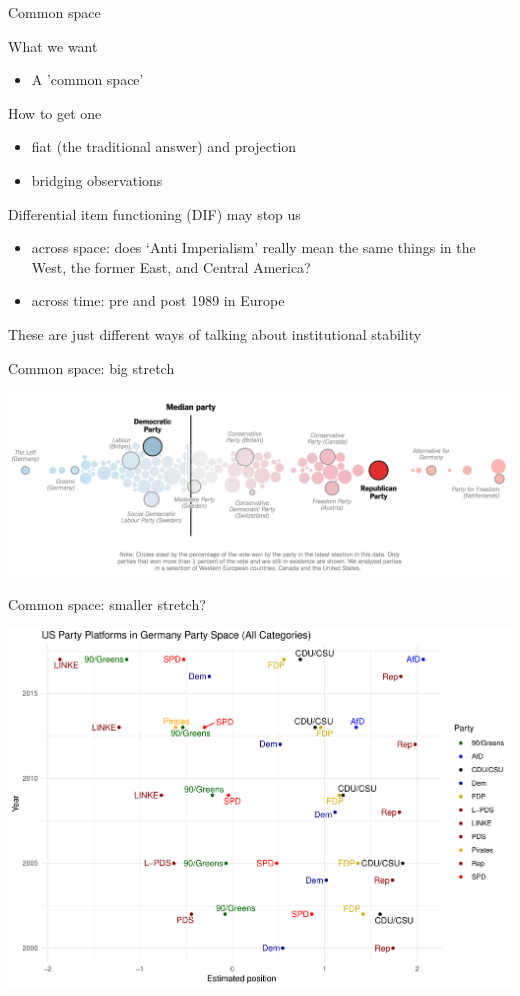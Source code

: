 \documentclass{hertieteaching}
\begin{document}
\begin{frame}{Common space}

What we want
\begin{itemize}
  \item A 'common space' \parencite{Kluver2009}
\end{itemize}
How to get one
\begin{itemize}
  \item fiat (the traditional answer) and projection
  \item bridging observations
\end{itemize}

Differential item functioning (DIF) may stop us
\begin{itemize}
  \item across space: does `Anti Imperialism' really mean the same things in the West, the former East, and Central America?
  \item across time: pre and post 1989 in Europe
\end{itemize}
These are just different ways of talking about 
institutional stability

\end{frame}
\begin{frame}{Common space: big stretch}

\centerline{\includegraphics[scale=0.45]{pictures/nyt-parties}}

\end{frame}
\begin{frame}{Common space: smaller stretch?}

\centerline{\includegraphics[scale=.4]{pictures/cmpcats_us_in_de}}

\end{frame}
\end{document}
